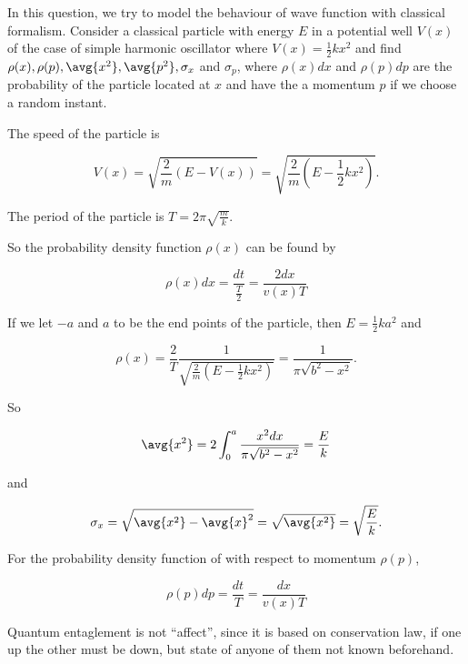 \documentclass[a4paper,12pt]{report}
\begin{document}
{In this question, we try to model the behaviour of wave function with classical formalism. Consider a classical particle with energy \(E\) in a potential well \(V(x)\) of the case of simple harmonic oscillator where \(V(x) = \frac12 kx^2\) and find \(\rho(x),\rho(p), \avg{x^2}, \avg{p^2}, \sigma_x\) and \(\sigma_p\), where \(\rho(x)dx\) and \(\rho(p)dp\) are the probability of the particle located at \(x\) and have the a momentum \(p\) if we choose a random instant.}
{The speed of the particle is
	
\begin{equation}
  V(x) = \sqrt{\frac{2}{m} (E - V(x))} = \sqrt{\frac{2}{m} (E - \frac{1}{2} kx^2 )}.  
\end{equation}
		
The period of the particle is  \(T = 2\pi \sqrt{\frac{m}{k}}\).
		
So the probability density function \(\rho(x)\) can be found by
		
\begin{equation}
  \rho (x) dx = \frac{dt}{\frac{T}{2} } = \frac{2dx}{v(x)T}  
\end{equation}
		
If we let \(-a\) and \(a\) to be the end points of the particle, then \(E = \frac{1}{2}  ka^2\) and
		
\begin{equation}
  \rho (x) = \frac{2}{T} \frac{1}{\sqrt{\frac{2}{m} (E - \frac{1}{2} kx^2 )} } = \frac{1}{\pi \sqrt{b^2 -x^2 } }.  
\end{equation}

So 
		
\begin{equation}
  \avg{x^2 } = 2\int_{0}^{a} \frac{x^2 dx}{\pi \sqrt{b^2 -x^2 } } =  \frac{E}{k}    
\end{equation}

and 

\begin{equation}
  \sigma _{x} = \sqrt{\avg{x^2 } - \avg{x} ^2  } = \sqrt{\avg{x^2 } } = \sqrt{\frac{E}{k} }.   
\end{equation}

For the probability density function of with respect to momentum \(\rho(p)\), 

\begin{equation}
  \rho (p)dp = \frac{dt}{T}  = \frac{dx}{v(x)T}  
\end{equation}}

Quantum entaglement is not ``affect'', since it is based on conservation law, if one up the other must be down, but state of anyone of them not known beforehand.
	









	
\end{document}
